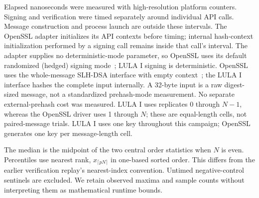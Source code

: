 Elapsed nanoseconds were measured with high-resolution platform counters. Signing and verification were timed separately around individual API calls. Message construction and process launch are outside these intervals. The OpenSSL adapter initializes its API contexts before timing; internal hash-context initialization performed by a signing call remains inside that call's interval. The adapter supplies no deterministic-mode parameter, so OpenSSL uses its default randomized (hedged) signing mode~\cite{openssl}; LULA I signing is deterministic. OpenSSL uses the whole-message SLH-DSA interface with empty context~\cite{openssl}; the LULA I interface hashes the complete input internally. A 32-byte input is a raw digest-sized message, not a standardized prehash-mode measurement. No separate external-prehash cost was measured. LULA I uses replicates 0 through $N-1$, whereas the OpenSSL driver uses 1 through $N$; these are equal-length cells, not paired-message trials. LULA I uses one key throughout this campaign; OpenSSL generates one key per message-length cell.

The median is the midpoint of the two central order statistics when $N$ is even. Percentiles use nearest rank, $x_{\lceil pN\rceil}$ in one-based sorted order. This differs from the earlier verification replay's nearest-index convention. Untimed negative-control sentinels are excluded. We retain observed maxima and sample counts without interpreting them as mathematical runtime bounds.


